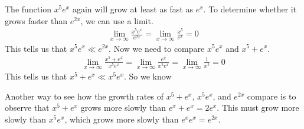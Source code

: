 \documentclass{article}
\begin{document}
\begin{enumerate}
\begin{enumerate}
\begin{solution}
    The function $x^5e^x$ again will grow at least as fast as $e^x$. To determine whether it grows faster than $e^{2x}$, we can use a limit.
    \begin{align*}
        \lim_{x\to \infty} \frac{x^5e^x}{e^{2x}} = \lim_{x\to\infty} \frac{x^5} {e^x}= 0
    \end{align*}
    This tells us that $x^5e^x \ll e^{2x}$. Now we need to compare $x^5e^x$ and $x^5+e^x$.
    \begin{align*}
        \lim_{x\to \infty} \frac{x^5+e^x}{x^5e^x} = \lim_{x\to\infty} \frac{e^x} {x^5e^x}=\lim_{x\to\infty} \frac{1}{x^5}= 0
    \end{align*}
    This tells us that $x^5+e^x \ll x^5e^x$. So we know 

    Another way to see how the growth rates of $x^5 + e^x$, $x^5e^x$, and $e^{2x}$ compare is to observe that $x^5 + e^x$ grows more slowly than $e^x+e^x=2e^x$. This must grow more slowly than $x^5e^x$, which grows more slowly than $e^xe^x = e^{2x}$.
\end{solution}
\end{enumerate}
\end{enumerate}
\end{document}
